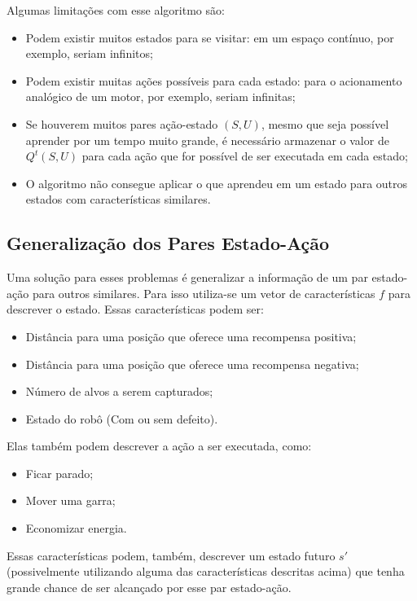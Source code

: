 Algumas limitações com esse algoritmo são:

\begin{itemize}
	\item Podem existir muitos estados para se visitar: em um espaço contínuo, por exemplo, seriam infinitos;
	\item Podem existir muitas ações possíveis para cada estado: para o acionamento analógico de um motor, por exemplo, seriam infinitas;
	\item Se houverem muitos pares ação-estado $ \left( S, U \right) $, mesmo que seja possível aprender por um tempo muito grande, é necessário armazenar o valor de $ Q^t \left( S, U \right) $ para cada ação que for possível de ser executada em cada estado;
	\item O algoritmo não consegue aplicar o que aprendeu em um estado para outros estados com características similares.
\end{itemize}

\subsection{Generalização dos Pares Estado-Ação} \label{subsection:GeneralizaçãoParesEstadoAção}

Uma solução para esses problemas é generalizar a informação de um par estado-ação para outros similares. Para isso utiliza-se um vetor de características $ f $ para descrever o estado. Essas características podem ser:

\begin{itemize}
	\item Distância para uma posição que oferece uma recompensa positiva;
	\item Distância para uma posição que oferece uma recompensa negativa;
	\item Número de alvos a serem capturados;
	\item Estado do robô (Com ou sem defeito).
\end{itemize}

Elas também podem descrever a ação a ser executada, como:

\begin{itemize}
	\item Ficar parado;
	\item Mover uma garra;
	\item Economizar energia.
\end{itemize}

Essas características podem, também, descrever um estado futuro $ s' $ (possivelmente utilizando alguma das características descritas acima) que tenha grande chance de ser alcançado por esse par estado-ação.

